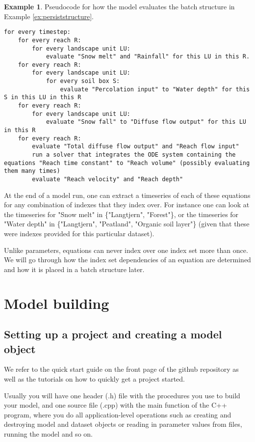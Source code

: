 \documentclass[11pt]{article}
\theoremstyle{definition}
\newtheorem{myexample}{Example}
\newenvironment{example}%
  {\begin{lrbox}{\examplebox}%
   \begin{minipage}{\dimexpr\linewidth-2\fboxsep}
   \begin{myexample}}%
  {\end{myexample}%
   \end{minipage}%
   \end{lrbox}%
   \begin{trivlist}
     \item[]\colorbox{silver}{\usebox\examplebox}
   \end{trivlist}}
\begin{document}
\begin{example}\label{ex:pseucocode}
Pseudocode for how the model evaluates the batch structure in Example \ref{ex:persiststructure}.
\begin{lstlisting}[style=textstyle]
for every timestep:
	for every reach R:
		for every landscape unit LU:
			evaluate "Snow melt" and "Rainfall" for this LU in this R.
	for every reach R:
		for every landscape unit LU:
			for every soil box S:
				evaluate "Percolation input" to "Water depth" for this S in this LU in this R
	for every reach R:
		for every landscape unit LU:
			evaluate "Snow fall" to "Diffuse flow output" for this LU in this R
	for every reach R:
		evaluate "Total diffuse flow output" and "Reach flow input"
		run a solver that integrates the ODE system containing the equations "Reach time constant" to "Reach volume" (possibly evaluating them many times)
		evaluate "Reach velocity" and "Reach depth"
\end{lstlisting}	
\end{example}

At the end of a model run, one can extract a timeseries of each of these equations for any combination of indexes that they index over. For instance one can look at the timeseries for "Snow melt" in \{"Langtjern", "Forest"\}, or the timeseries for "Water depth" in \{"Langtjern", "Peatland", "Organic soil layer"\} (given that these were indexes provided for this particular dataset).

Unlike parameters, equations can never index over one index set more than once. We will go through how the index set dependencies of an equation are determined and how it is placed in a batch structure later.

\section{Model building}\label{sec:modelbuilding}

\subsection{Setting up a project and creating a model object}

We refer to the quick start guide on the front page of the github repository as well as the tutorials on how to quickly get a project started.

Usually you will have one header (.h) file with the procedures you use to build your model, and one source file (.cpp) with the main function of the C++ program, where you do all application-level operations such as creating and destroying model and dataset objects or reading in parameter values from files, running the model and so on.
\end{document}
